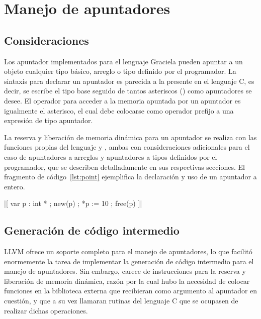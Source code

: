 {{%
\section{Manejo de apuntadores}

\subsection{Consideraciones}
Los apuntador implementados para el lenguaje Graciela pueden apuntar a un
objeto cualquier tipo básico, arreglo o tipo definido por el programador. La
sintaxis para declarar un apuntador es parecida a la presente en  el lenguaje
C, es decir, se escribe el tipo base seguido de tantos asteriscos (\ingra{*})
como apuntadores se desee. El operador para acceder a la memoria apuntada por
un apuntador es igualmente el asterisco, el cual debe colocarse como operador
prefijo a una expresión de tipo apuntador.

La reserva y liberación de memoria dinámica para un apuntador se realiza con las
funciones propias del lenguaje  y , ambas con
consideraciones adicionales para el caso de apuntadores a arreglos y apuntadores
a tipos definidos por el programador, que se describen detalladamente en sus
respectivas secciones. El fragmento de código~\ref{lst:point} ejemplifica la
declaración y uso de un apuntador a entero.

\begin{gracielacode}[caption=Uso de apuntadores, label=lst:point]
|[ var p : int *
 ;  new(p)
 ;  *p := 10
 ;  free(p)
]|
\end{gracielacode}

\subsection{Generación de código intermedio}

LLVM ofrece un soporte completo para el manejo de apuntadores, lo que facilitó
enormemente la tarea de implementar la generación de código intermedio para el
manejo de apuntadores. Sin embargo, carece de instrucciones para la reserva y
liberación de memoria dinámica, razón por la cual hubo la necesidad de colocar
funciones en la biblioteca externa que recibieran como argumento al apuntador en
cuestión, y que a su vez llamaran rutinas del lenguaje C que se ocupasen de
realizar dichas operaciones.

}}
